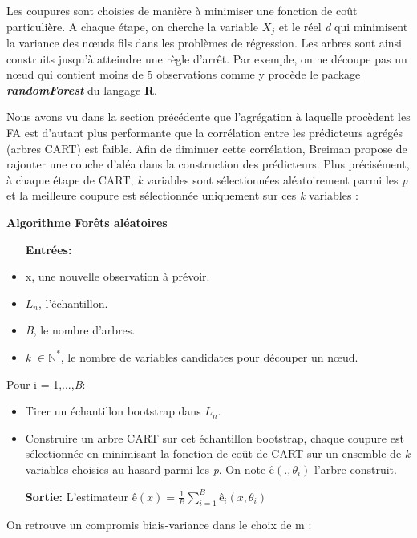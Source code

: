 	\par
	Les coupures sont choisies de manière à minimiser une fonction de coût particulière. A chaque étape, on cherche la variable $X_j$ et le réel \textit{d} qui minimisent la variance des nœuds fils dans les problèmes de régression. Les arbres sont ainsi construits jusqu’à atteindre une règle d’arrêt. Par exemple, on ne découpe pas un nœud qui contient moins de 5 observations comme y procède le package \textbf{\textit{randomForest}} du langage \textbf{R}.
	\par
	Nous avons vu dans la section précédente que l'agrégation à laquelle procèdent les FA est d’autant plus performante que la corrélation entre les prédicteurs agrégés  (arbres CART) est faible. Afin de diminuer cette corrélation, Breiman\cite{BREI01} propose de rajouter une couche d’aléa dans la construction des
	prédicteurs. Plus précisément, à chaque étape de CART, \textit{k} variables sont sélectionnées aléatoirement parmi les \textit{p} et la meilleure coupure est sélectionnée uniquement sur ces \textit{k} variables : \par
	\textbf{Algorithme Forêts aléatoires}
	\begin{itemize}
	\item[\textbf{Entrées:}]
	\item x, une nouvelle observation à prévoir.
	\item \textit{$L_n$}, l'échantillon.
	\item \textit{B}, le nombre d'arbres.
	\item \textit{k} $\in \mathbb{N}^* $, le nombre de variables candidates pour découper un nœud.
	\end{itemize}
	Pour i = 1,...,\textit{B}:
	\begin{itemize}
	\item Tirer un échantillon bootstrap dans \textit{$L_n$}.
	\item Construire un arbre CART sur cet échantillon bootstrap, chaque coupure est sélectionnée
	en minimisant la fonction de coût de CART sur un ensemble de \textit{k} variables choisies au
	hasard parmi les \textit{p}. On note $ê(.,\theta_i)$ l’arbre construit.
	\item[\textbf{Sortie:}]L’estimateur ${ê(x) =  \frac{1}{B} \sum_{i=1}^{B} ê_i(x,\theta_i)}$
	\end{itemize}	
	On retrouve un compromis biais-variance dans le choix de m :
